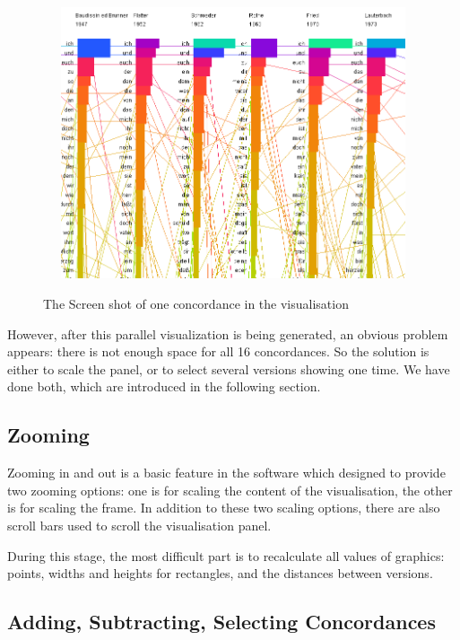 \begin{figure}[h]
	\centering	
	\includegraphics[width=13cm, height=8cm]{Figs/Parallel-Vis}\\[1ex]
	\caption{The Screen shot of one concordance in the visualisation}
	\label{fig:parallelConcor}
\end{figure} 


However, after this parallel visualization is being generated, an obvious problem appears: there is not enough space for all 16 concordances. So the solution is either to scale the panel, or to select several versions showing one time. We have done both, which are introduced in the following section. 

\subsection{Zooming}

Zooming in and out is a basic feature in the software which designed to provide two zooming options: one is for scaling the content of the visualisation, the other is for scaling the frame. In addition to these two scaling options, there are also scroll bars used to scroll the visualisation panel.

During this stage, the most difficult part is to recalculate all values of graphics: points, widths and heights for rectangles, and the distances between versions.


\subsection{Adding, Subtracting, Selecting Concordances}

